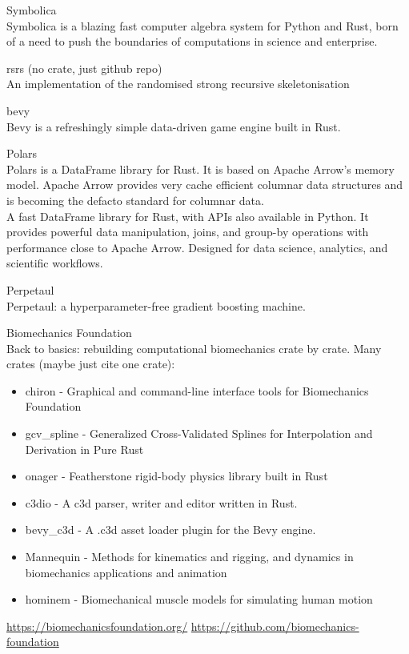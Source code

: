 \documentclass{article}
\begin{document}
Symbolica\\
Symbolica is a blazing fast computer algebra system for Python and Rust, born of a need
to push the boundaries of computations in science and enterprise.

rsrs (no crate, just github repo)\\
An implementation of the randomised strong recursive
skeletonisation

bevy\\
Bevy is a refreshingly simple data-driven game engine built in Rust.

Polars\\
Polars is a DataFrame library for Rust. It is based on Apache Arrow’s memory model. Apache
Arrow provides very cache efficient columnar data structures and is becoming the defacto standard
for columnar data.\\
A fast DataFrame library for Rust, with APIs also available in Python. It
provides powerful data manipulation, joins, and group-by operations with performance close to
Apache Arrow. Designed for data science, analytics, and scientific workflows.

Perpetaul\\
Perpetaul: a hyperparameter-free gradient boosting machine.

Biomechanics Foundation\\
Back to basics: rebuilding computational biomechanics crate by crate.
Many crates (maybe just cite one crate):
\begin{itemize}
    \item chiron - Graphical and command-line interface tools for Biomechanics Foundation
    \item gcv\_spline - Generalized Cross-Validated Splines for Interpolation and
        Derivation in Pure Rust
    \item onager - Featherstone rigid-body physics library built in Rust
    \item c3dio - A c3d parser, writer and editor written in Rust.
    \item bevy\_c3d - A .c3d asset loader plugin for the Bevy engine.
    \item Mannequin - Methods for kinematics and rigging, and dynamics in biomechanics
        applications and
        animation
    \item hominem - Biomechanical muscle models for simulating human motion
\end{itemize}
\url{https://biomechanicsfoundation.org/}
\url{https://github.com/biomechanics-foundation}
\end{document}
